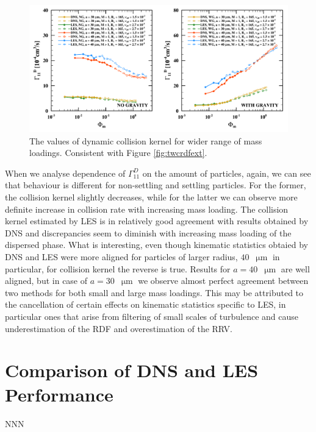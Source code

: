 \documentclass{pracamgren}
\begin{document}
\begin{figure}[h]
\centering
\includegraphics[width=13.5cm]{figures/2-13_twcgammaext.pdf}
\caption{
The values of dynamic collision kernel for wider range of mass loadings.
Consistent with Figure \ref{fig:twcrdfext}.
}
\label{fig:twcgammaext}
\end{figure}

When we analyse dependence of $\Gamma^D_{11}$ on the amount of particles, again, we can see that behaviour is different for non-settling and settling particles.
For the former, the collision kernel slightly decreases, while for the latter we can observe more definite increase in collision rate with increasing mass loading.
The collision kernel estimated by LES is in relatively good agreement with results obtained by DNS and discrepancies seem to diminish with increasing mass loading of the dispersed phase.
What is interesting, even though kinematic statistics obtaied by DNS and LES were more aligned for particles of larger radius, $40$~$\upmu\text{m}$ in particular, for collision kernel the reverse is true.
Results for $a = 40$~$\upmu\text{m}$ are well aligned, but in case of $a = 30$~$\upmu\text{m}$ we observe almost perfect agreement between two methods for both small and large mass loadings.
This may be attributed to the cancellation of certain effects on kinematic statistics specific to LES, in particular ones that arise from filtering of small scales of turbulence and cause underestimation of the RDF and overestimation of the RRV.



\chapter{Comparison of DNS and LES Performance}
\label{ch:ch3}

NNN
\end{document}
